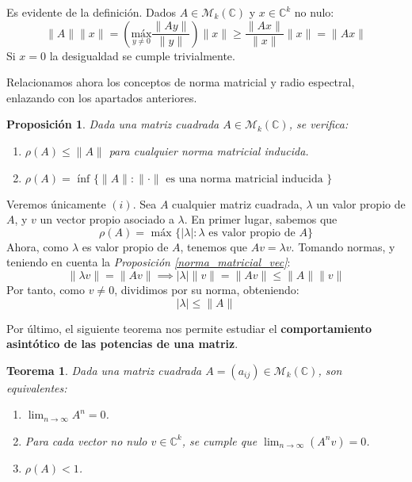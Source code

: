 \documentclass[11pt, a4paper]{article}
\makeatletter
\newif\IfInSansMode
\let\oldsf\sffamily
\renewcommand*{\sffamily}{\oldsf\mathversion{sans}\InSansModetrue}
\let\oldnorm\normalfont
\renewcommand*{\normalfont}{\oldnorm\InSansModefalse\mathversion{normal}}
\renewenvironment{proof}[1][\proofname] {\vspace{-15pt}\par\pushQED{\qed}\normalfont\topsep6\p@\@plus6\p@\relax\trivlist\item[\hskip\labelsep\it#1\@addpunct{.}]\ignorespaces}{\popQED\endtrivlist\@endpefalse}
\numberwithin{equation}{section}
\newcommand{\la}{\lambda}
\renewenvironment{proof}[1][\proofname] {\par\pushQED{\qed}\normalfont\topsep6\p@\@plus6\p@\relax\trivlist\item[\hskip\labelsep\itshape\sffamily#1\@addpunct{.}]\ignorespaces}{\popQED\endtrivlist\@endpefalse}
\theoremstyle{theorem-style}
\newtheorem{nth}{Teorema}[section]
\newtheorem{nprop}{Proposición}[section]
\theoremstyle{definition-style}
\theoremstyle{remark-style}
\theoremstyle{example-style}
\newenvironment{nlist}
{\begin{enumerate}
    \renewcommand\labelenumi{(\emph{\roman{enumi})}}}
  {\end{enumerate}}
\makeatother
\begin{document}
\begin{proof} Es evidente de la definición. Dados $A \in \mathcal M_k(\mathbb{C})$ y $x \in \mathbb{C}^k$ no nulo: $$\|A\|\|x\| = \left(\underset{y \ne 0}{\text{máx}} \frac{\|Ay\|}{\|y\|}\right)\|x\| \ge \frac{\|Ax\|}{\|x\|}\|x\| = \|Ax\|$$ Si $x = 0$ la desigualdad se cumple trivialmente.
\end{proof}

Relacionamos ahora los conceptos de norma matricial y radio espectral, enlazando con los apartados anteriores.

\begin{nprop}
    Dada una matriz cuadrada $A \in \mathcal M_k(\mathbb{C})$, se verifica: \begin{nlist}
        \item $\rho(A) \leq \|A\|$ para cualquier norma matricial inducida.
        \item $\rho(A) = \text{ ínf } \{\|A\| : \|\cdot\| \text{ es una norma matricial inducida } \}$
    \end{nlist}
\end{nprop}

\begin{proof} Veremos únicamente $(i)$. Sea $A$ cualquier matriz cuadrada, $\lambda$ un valor propio de $A$, y $v$ un vector propio asociado a $\lambda$. En primer lugar, sabemos que $$\rho(A) = \text{ máx } \{ |\lambda| : \lambda \text{ es valor propio de } A \}$$ Ahora, como $\la$ es valor propio de $A$, tenemos que $Av = \la v$. Tomando normas, y teniendo en cuenta la \textit{Proposición \ref{norma_matricial_vec}}:
$$\|\lambda v\| = \|Av\| \implies |\la|\|v\| = \|Av\| \le \|A\|\|v\|$$
Por tanto, como $v\ne 0$, dividimos por su norma, obteniendo: $$|\lambda| \le \|A\|$$\end{proof}

Por último, el siguiente teorema nos permite estudiar el \textbf{comportamiento asintótico de las potencias de una matriz}.
\begin{nth}
    Dada una matriz cuadrada $A = (a_{ij})\in \mathcal M_k(\mathbb C)$, son equivalentes: 
    \begin{nlist}
        \item $\displaystyle \lim_{n \to \infty} A^n = 0$.
        \item Para cada vector no nulo $v \in \mathbb C^{k}$, se cumple que $\displaystyle \lim_{n \to \infty}(A^n v) = 0$.
        \item $\rho(A) < 1$.
    \end{nlist}
\end{nth}
\end{document}
